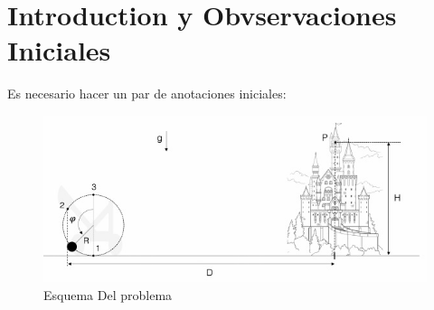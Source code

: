 \documentclass[fleqn,10pt]{SelfArx} %
\affiliation{*\textbf{Mail}: ezequielremus@gmail.com} %
\begin{document}
\flushbottom %
\maketitle %
\tableofcontents %
\thispagestyle{empty} %


\section*{Introduction y Obvservaciones Iniciales} %


Es necesario hacer un par de anotaciones iniciales: 
\begin{figure}[h] %
\includegraphics[scale=0.5]{figuras/fig1.jpg}
\caption{Esquema Del problema}
\label{fig:1}
\end{figure}
\end{document}
